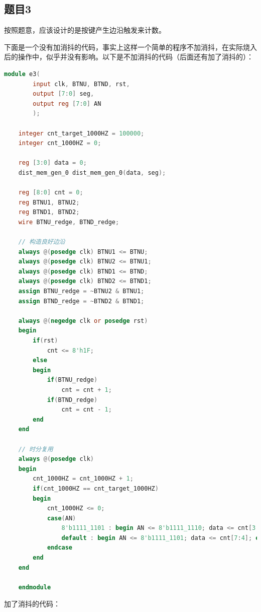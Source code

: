 \documentclass[UTF8]{article}
\begin{document}
	\subsection{题目3}
	按照题意，应该设计的是按键产生边沿触发来计数。\par
	下面是一个没有加消抖的代码，事实上这样一个简单的程序不加消抖，在实际烧入后的操作中，似乎并没有影响。以下是不加消抖的代码（后面还有加了消抖的）：\par
	\begin{lstlisting}[language=Verilog]
	module e3(
		input clk, BTNU, BTND, rst,
		output [7:0] seg,
		output reg [7:0] AN
		);
	
	integer cnt_target_1000HZ = 100000;
	integer cnt_1000HZ = 0;
	
	reg [3:0] data = 0;
	dist_mem_gen_0 dist_mem_gen_0(data, seg);
	
	reg [8:0] cnt = 0;
	reg BTNU1, BTNU2;
	reg BTND1, BTND2;
	wire BTNU_redge, BTND_redge;
	
	// 构造良好边沿
	always @(posedge clk) BTNU1 <= BTNU;
	always @(posedge clk) BTNU2 <= BTNU1;
	always @(posedge clk) BTND1 <= BTND;
	always @(posedge clk) BTND2 <= BTND1;
	assign BTNU_redge = ~BTNU2 & BTNU1;
	assign BTND_redge = ~BTND2 & BTND1;
	
	always @(negedge clk or posedge rst)
	begin
		if(rst)
			cnt <= 8'h1F;
		else
		begin
			if(BTNU_redge)
				cnt = cnt + 1;
			if(BTND_redge)
				cnt = cnt - 1;
		end
	end
	
	// 时分复用
	always @(posedge clk)
	begin
		cnt_1000HZ = cnt_1000HZ + 1;
		if(cnt_1000HZ == cnt_target_1000HZ)
		begin
			cnt_1000HZ <= 0;
			case(AN)
				8'b1111_1101 : begin AN <= 8'b1111_1110; data <= cnt[3:0]; end
				default : begin AN <= 8'b1111_1101; data <= cnt[7:4]; end
			endcase
		end
	end
	
	endmodule
	\end{lstlisting}
	加了消抖的代码：\par
\end{document}

